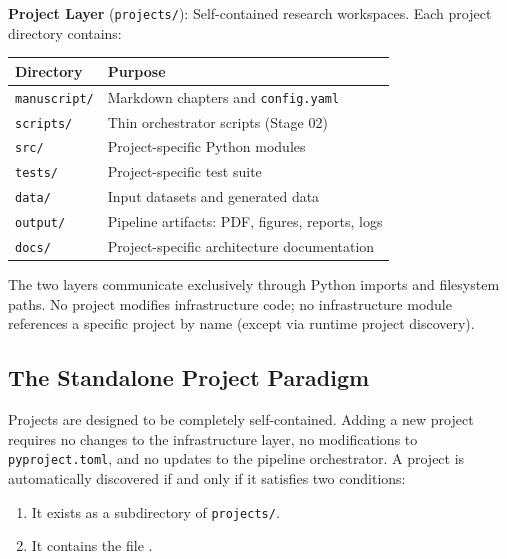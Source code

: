 \documentclass[
]{article}
\newcounter{none} %
\providecommand{\tightlist}{%
  \setlength{\itemsep}{0pt}\setlength{\parskip}{0pt}}
\begin{document}
\textbf{Project Layer} (\texttt{projects/}): Self-contained research
workspaces. Each project directory contains:

{\def\LTcaptype{none} %
\begin{longtable}[]{@{}ll@{}}
\toprule\noalign{}
Directory & Purpose \\
\midrule\noalign{}
\endhead
\bottomrule\noalign{}
\endlastfoot
\texttt{manuscript/} & Markdown chapters and \texttt{config.yaml} \\
\texttt{scripts/} & Thin orchestrator scripts (Stage 02) \\
\texttt{src/} & Project-specific Python modules \\
\texttt{tests/} & Project-specific test suite \\
\texttt{data/} & Input datasets and generated data \\
\texttt{output/} & Pipeline artifacts: PDF, figures, reports, logs \\
\texttt{docs/} & Project-specific architecture documentation \\
\end{longtable}
}

The two layers communicate exclusively through Python imports and
filesystem paths. No project modifies infrastructure code; no
infrastructure module references a specific project by name (except via
runtime project discovery).

\subsection{The Standalone Project
Paradigm}\label{the-standalone-project-paradigm}

Projects are designed to be completely self-contained. Adding a new
project requires no changes to the infrastructure layer, no
modifications to \texttt{pyproject.toml}, and no updates to the pipeline
orchestrator. A project is automatically discovered if and only if it
satisfies two conditions:

\begin{enumerate}
\def\labelenumi{\arabic{enumi}.}
\tightlist
\item
  It exists as a subdirectory of \texttt{projects/}.
\item
  It contains the file .
\end{enumerate}
\end{document}
